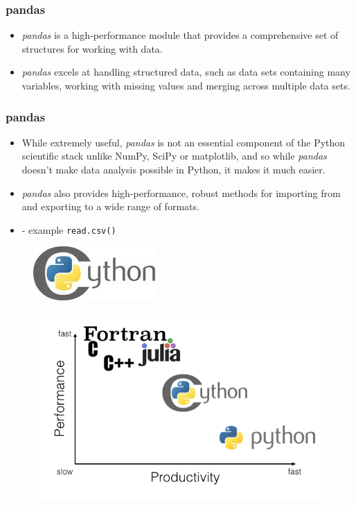 \documentclass[MASTER.tex]{subfiles}
\begin{document}
\begin{frame}
\frametitle{pandas}
\Large
\begin{itemize}
\item 	\textit{pandas} is a high-performance module that provides a comprehensive set of structures for working with
data. 
\item \textit{pandas} excels at handling structured data, such as data sets containing many variables, working with
missing values and merging across multiple data sets. 
\end{itemize}
\end{frame}

\begin{frame}
	\large
	\frametitle{pandas}	
	\large
	\begin{itemize}
	
	\item While extremely useful, \textit{pandas} is not an essential component of the Python scientific stack unlike NumPy, SciPy or matplotlib, and so while \textit{pandas} doesn’t
	make data analysis possible in Python, it makes it much easier. \item \textit{pandas} also provides high-performance,
	robust methods for importing from and exporting to a wide range of formats.
	\item - example \texttt{read.csv()}
	\end{itemize}
\end{frame}
\begin{frame}
	\begin{figure}

\includegraphics[width=0.5\linewidth]{cythonlogo}

\end{figure}

\begin{figure}
\centering
\includegraphics[width=0.7\linewidth]{cython_vs_chart}

\end{figure}

\end{frame}
\end{document}
